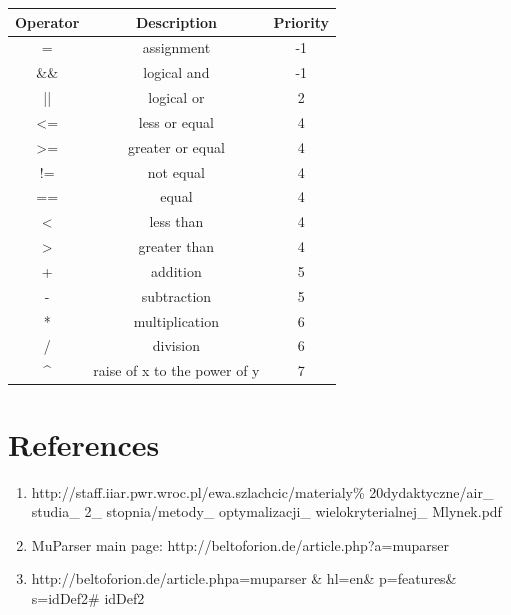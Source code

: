 \documentclass[11pt]{article}
\begin{document}
	\newpage	
	\begin{center}
	\begin{tabular}{| c | c | c |}
		\hline
		\textbf{Operator} & \textbf{Description} & \textbf{Priority}\\ \hline
		= & assignment & -1\\ \hline
		\&\& & logical and & -1\\ \hline
		|| & logical or & 2\\ \hline
		<= & less or equal & 4\\ \hline
		>= & greater or equal & 4\\ \hline
		!= & not equal & 4\\ \hline
		== & equal & 4\\ \hline
		< & less than & 4\\ \hline
		> & greater than & 4\\ \hline
		+ & addition & 5\\ \hline
		- & subtraction & 5\\ \hline
		* & multiplication & 6\\ \hline
		/ & division & 6\\ \hline
		\^{} & raise of x to the power of y & 7\\
		\hline
	\end{tabular}			
	\end{center}
	
	\newpage
	\section{References}
	
	\begin{enumerate}
		\item http://staff.iiar.pwr.wroc.pl/ewa.szlachcic/materialy\%
		20dydaktyczne/air\_ studia\_ 2\_ stopnia/metody\_ optymalizacji\_ wielokryterialnej\_ Mlynek.pdf
		\item MuParser main page: http://beltoforion.de/article.php?a=muparser
		\item http://beltoforion.de/article.phpa=muparser \& hl=en\& p=features\& s=idDef2\# idDef2
	\end{enumerate}
		
	
\end{document}
